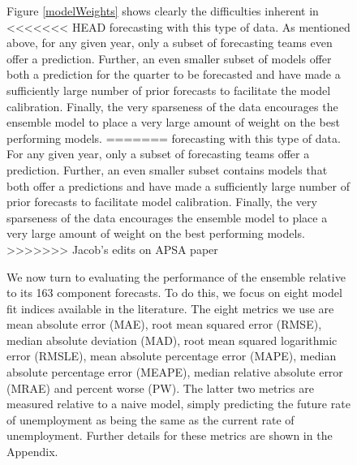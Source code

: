 \documentclass[12pt,fullpage,endnotes]{article}
\begin{document}
\begin{figure}[h]
\begin{figure}[h]
\end{figure}

Figure \ref{modelWeights} shows clearly the difficulties inherent in
<<<<<<< HEAD
forecasting with this type of data. As mentioned above, for any given year, only a subset
of forecasting teams even offer a prediction.  Further, an even smaller
subset of models offer both a prediction for the quarter to be forecasted and have made a sufficiently large
number of prior forecasts to facilitate the model calibration.  Finally,
the very sparseness of the data encourages the ensemble model to place a very
large amount of weight on the best performing models.
=======
forecasting with this type of data.  For any given year, only a subset
of forecasting teams offer a prediction.  Further, an even smaller
subset contains models that both offer a predictions and have made a
sufficiently large number of prior forecasts to facilitate model
calibration.  Finally, the very sparseness of the data encourages the
ensemble model to place a very large amount of weight on the best
performing models.  
>>>>>>> Jacob's edits on APSA paper

We now turn to evaluating the performance of the ensemble relative to
its 163 component forecasts.  To do this, we focus on eight model fit
indices available in the literature.  The eight metrics we use are
mean absolute error (MAE), root mean squared error (RMSE), median
absolute deviation (MAD), root mean squared logarithmic error (RMSLE), %
mean absolute percentage error (MAPE), median absolute percentage
error (MEAPE), median relative absolute error (MRAE) and percent worse
(PW).  The latter two metrics are measured relative to a naive model,
simply predicting the future rate of unemployment as being the same as
the current rate of unemployment.  Further details for these metrics
are shown in the Appendix.



\end{figure}
\end{document}
